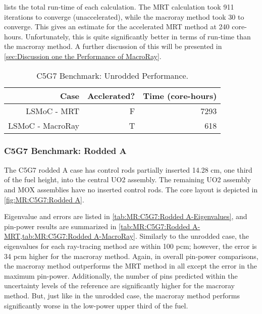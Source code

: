 {{{{         lists the total run-time of each calculation.
        The \ac{MRT} calculation took 911 iterations to converge (unaccelerated), while the macroray method took 30 to converge.
        This gives an estimate for the accelerated \ac{MRT} method at 240 core-hours.
        Unfortunately, this is quite significantly better in terms of run-time than the macroray method.
        A further discussion of this will be presented in \cref{sec:Discussion one the Performance of MacroRay}.

        \begin{table}[htbp]
          \centering
          \caption{C5G7 Benchmark: Unrodded Performance. \label{tab:MR:C5G7:Unrodded-Performance}}
          \begin{tabular}{rrr}\toprule
            Case                        & Acclerated? & Time (core-hours)\\\midrule
            LSMoC - MRT                 & F & 7293\\
            LSMoC - MacroRay            & T & 618\\\bottomrule
          \end{tabular}
        \end{table}
      }

      \subsubsection{C5G7 Benchmark: Rodded A}{\label{sssec:MR:C5G7:Rodded A}
        The C5G7 rodded A case has control rods partially inserted 14.28 cm, one third of the fuel height, into the central \ac{UO2} assembly.
        The remaining \ac{UO2} assembly and \ac{MOX} assemblies have no inserted control rods.
        The core layout is depicted in \cref{fig:MR:C5G7:Rodded A}.

        Eigenvalue and errors are listed in \cref{tab:MR:C5G7:Rodded A-Eigenvalues}, and pin-power results are summarized in \cref{tab:MR:C5G7:Rodded A-MRT,tab:MR:C5G7:Rodded A-MacroRay}.
        Similarly to the unrodded case, the eigenvalues for each ray-tracing method are within 100 pcm; however, the error is 34 pcm higher for the macroray method.
        Again, in overall pin-power comparisons, the macroray method outperforms the MRT method in all except the error in the maximum pin-power.
        Additionally, the number of pins predicted within the uncertainty levels of the reference are significantly higher for the macroray method.
        But, just like in the unrodded case, the macroray method performs significantly worse in the low-power upper third of the fuel.

}}}}
